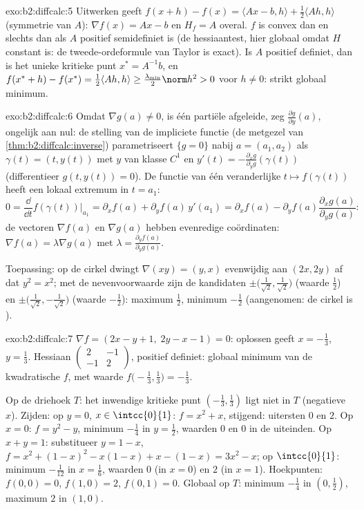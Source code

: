 \begin{solution}{exo:b2:diffcalc:5}
Uitwerken geeft $f(x + h) - f(x) = \langle Ax - b, h\rangle +
\frac12\langle Ah, h\rangle$ (symmetrie van $A$): $\nabla f(x) = Ax
- b$ en $H_f = A$ overal. $f$ is convex dan en slechts dan als $A$
positief semidefiniet is (de hessiaantest, hier globaal omdat $H$
constant is: de tweede-ordeformule van Taylor is exact). Is $A$
positief definiet, dan is het unieke kritieke punt $x^* = A^{-1}b$,
en $f(x^* + h) - f(x^*) = \frac12\langle Ah, h\rangle \geq
\frac{\lambda_{\min}}{2}\norm h^2 > 0$ voor $h \neq 0$: strikt
globaal minimum.
\end{solution}

\begin{solution}{exo:b2:diffcalc:6}
Omdat $\nabla g(a) \neq 0$, is één partiële afgeleide, zeg
$\frac{\partial g}{\partial y}(a)$, ongelijk aan nul: de stelling
van de impliciete functie (de metgezel van
\cref{thm:b2:diffcalc:inverse}) parametriseert $\{g = 0\}$ nabij $a
= (a_1, a_2)$ als $\gamma(t) = (t, y(t))$ met $y$ van klasse $C^1$
en $y'(t) = -\frac{\partial_x g}{\partial_y g}(\gamma(t))$
(differentieer $g(t, y(t)) = 0$). De functie van één veranderlijke
$t \mapsto f(\gamma(t))$ heeft een lokaal extremum in $t = a_1$:
\[
0 = \frac{\dd}{\dd t}f(\gamma(t))\Big|_{a_1}
= \partial_x f(a) + \partial_y f(a)\,y'(a_1)
= \partial_x f(a) - \partial_yf(a)\frac{\partial_x
g(a)}{\partial_y g(a)} :
\]
de vectoren $\nabla f(a)$ en $\nabla g(a)$ hebben evenredige
coördinaten: $\nabla f(a) = \lambda \nabla g(a)$ met $\lambda =
\frac{\partial_y f(a)}{\partial_y g(a)}$.

Toepassing: op de cirkel dwingt $\nabla(xy) = (y, x)$ evenwijdig
aan $(2x, 2y)$ af dat $y^2 = x^2$; met de nevenvoorwaarde zijn de
kandidaten $\pm\bigl(\tfrac{1}{\sqrt2}, \tfrac{1}{\sqrt2}\bigr)$
(waarde $\frac12$) en $\pm\bigl(\tfrac{1}{\sqrt2},
-\tfrac{1}{\sqrt2}\bigr)$ (waarde $-\frac12$): maximum $\frac12$,
minimum $-\frac12$ (aangenomen: de cirkel is ).
\end{solution}

\begin{solution}{exo:b2:diffcalc:7}
$\nabla f = (2x - y + 1,\; 2y - x - 1) = 0$: oplossen geeft $x =
-\frac13$, $y = \frac13$. Hessiaan $\begin{pmatrix} 2 & -1\\ -1 &
2\end{pmatrix}$, positief definiet: globaal minimum van de
kwadratische $f$, met waarde $f\bigl(-\frac13, \frac13\bigr) =
-\frac13$.

Op de driehoek $T$: het inwendige kritieke punt $(-\frac13,
\frac13)$ ligt niet in $T$ (negatieve $x$). Zijden: op $y = 0$, $x
\in \intcc{0}{1}$: $f = x^2 + x$, stijgend: uitersten $0$ en $2$.
Op $x = 0$: $f = y^2 - y$, minimum $-\frac14$ in $y = \frac12$,
waarden $0$ en $0$ in de uiteinden. Op $x + y = 1$: substitueer $y
= 1 - x$, $f = x^2 + (1-x)^2 - x(1-x) + x - (1-x) = 3x^2 - x$; op
$\intcc{0}{1}$: minimum $-\frac{1}{12}$ in $x = \frac16$, waarden
$0$ (in $x=0$) en $2$ (in $x=1$). Hoekpunten: $f(0,0) = 0$, $f(1,0)
= 2$, $f(0,1) = 0$. Globaal op $T$: minimum $-\frac14$ in $(0,
\frac12)$, maximum $2$ in $(1, 0)$.
\end{solution}

